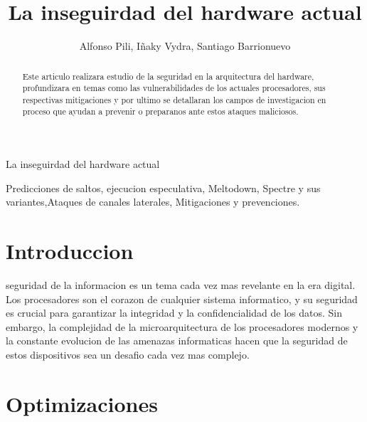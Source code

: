 \documentclass[lettersize,compsoc]{IEEEtran}
\begin{document}
\title{La inseguirdad del hardware actual}  %
\author{Alfonso Pili, Iñaky Vydra, Santiago Barrionuevo}

%
{La inseguirdad del hardware actual}

\maketitle

\begin{abstract} %
Este articulo realizara estudio de la seguridad en la arquitectura del hardware, profundizara en temas como las vulnerabilidades de los actuales procesadores, sus respectivas mitigaciones y por ultimo se detallaran los campos de investigacion en proceso que ayudan a prevenir o preparanos ante estos ataques maliciosos.
\end{abstract}

\begin{IEEEkeywords} %
Predicciones de saltos, ejecucion especulativa, Meltodown, Spectre y sus variantes,Ataques de canales laterales, Mitigaciones y prevenciones.
\end{IEEEkeywords}


\section{Introduccion}
 seguridad de la informacion es un tema cada vez mas revelante en la era digital. Los procesadores son el corazon de cualquier sistema informatico, y su seguridad es crucial para garantizar la integridad y la confidencialidad de los datos. Sin embargo, la complejidad de la microarquitectura de los procesadores modernos y la constante evolucion de las amenazas informaticas hacen que la seguridad de estos dispositivos sea un desafio cada vez mas complejo. 

\section{Optimizaciones}
\end{document}
